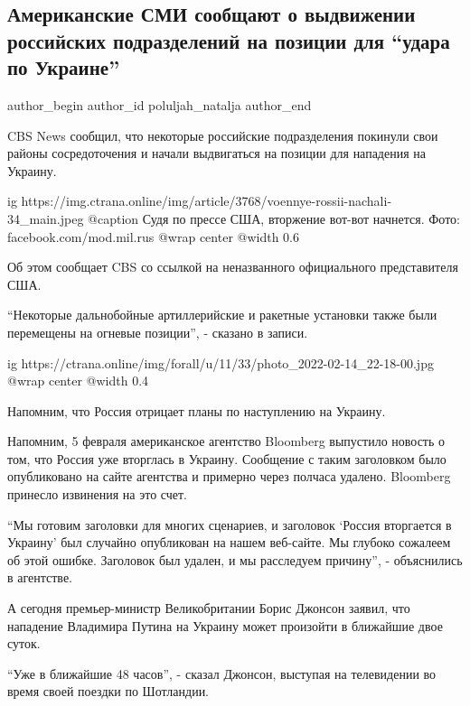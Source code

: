  
 
 
 
 
 
\subsection{Американские СМИ сообщают о выдвижении российских подразделений на позиции для \enquote{удара по Украине}}
\label{sec:14_02_2022.stz.news.ua.strana.2.rossia_armia_usa_smi_udar_po_ukraine}
 
\ifcmt
 author_begin
   author_id poluljah_natalja
 author_end
\fi

CBS News сообщил, что некоторые российские подразделения покинули свои районы
сосредоточения и начали выдвигаться на позиции для нападения на Украину.

\ifcmt
  ig https://img.ctrana.online/img/article/3768/voennye-rossii-nachali-34_main.jpeg
  @caption Судя по прессе США, вторжение вот-вот начнется. Фото: facebook.com/mod.mil.rus
  @wrap center
  @width 0.6
\fi

Об этом сообщает CBS со ссылкой на неназванного официального представителя США.

\enquote{Некоторые дальнобойные артиллерийские и ракетные установки также были
перемещены на огневые позиции}, - сказано в записи.

\ifcmt
  ig https://ctrana.online/img/forall/u/11/33/photo_2022-02-14_22-18-00.jpg
  @wrap center
  @width 0.4
\fi

Напомним, что Россия отрицает планы по наступлению на Украину.

Напомним, 5 февраля американское агентство Bloomberg выпустило новость о том,
что Россия уже вторглась в Украину. Сообщение с таким заголовком было
опубликовано на сайте агентства и примерно через полчаса удалено. Bloomberg
принесло извинения на это счет.

\enquote{Мы готовим заголовки для многих сценариев, и заголовок \enquote{Россия
вторгается в Украину} был случайно опубликован на нашем веб-сайте. Мы глубоко
сожалеем об этой ошибке. Заголовок был удален, и мы расследуем причину}, -
объяснились в агентстве.

А сегодня премьер-министр Великобритании Борис Джонсон заявил, что нападение
Владимира Путина на Украину может произойти в ближайшие двое суток.

\enquote{Уже в ближайшие 48 часов}, - сказал Джонсон, выступая на телевидении
во время своей поездки по Шотландии.
